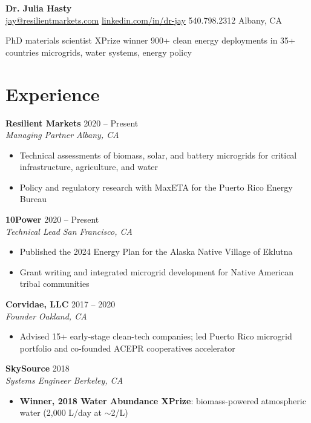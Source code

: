 \documentclass[11pt,letterpaper]{article}
\newcommand{\role}[4]{%
  \textbf{#1} \hfill #2\\
  \textit{#3} \hfill \textit{#4}\\[-2pt]
}
\begin{document}
\begin{center}
  {\LARGE\bfseries Dr. Julia Hasty}\\[6pt]
  \href{mailto:jay@resilientmarkets.com}{jay@resilientmarkets.com} \textbullet{}
  \href{https://www.linkedin.com/in/dr-jay/}{linkedin.com/in/dr-jay} \textbullet{}
  540.798.2312 \textbullet{} Albany, CA
\end{center}

\vspace{4pt}
\begin{center}
\small
PhD materials scientist \textbullet{} XPrize winner \textbullet{}
900+ clean energy deployments in 35+ countries \textbullet{}
microgrids, water systems, energy policy
\end{center}

\section{Experience}

\role{Resilient Markets}{2020 -- Present}{Managing Partner}{Albany, CA}
\begin{itemize}[nosep, leftmargin=*]
  \item Technical assessments of biomass, solar, and battery microgrids for critical infrastructure, agriculture, and water
  \item Policy and regulatory research with MaxETA for the Puerto Rico Energy Bureau
\end{itemize}

\role{10Power}{2020 -- Present}{Technical Lead}{San Francisco, CA}
\begin{itemize}[nosep, leftmargin=*]
  \item Published the 2024 Energy Plan for the Alaska Native Village of Eklutna
  \item Grant writing and integrated microgrid development for Native American tribal communities
\end{itemize}

\role{Corvidae, LLC}{2017 -- 2020}{Founder}{Oakland, CA}
\begin{itemize}[nosep, leftmargin=*]
  \item Advised 15+ early-stage clean-tech companies; led Puerto Rico microgrid portfolio and co-founded ACEPR cooperatives accelerator
\end{itemize}

\role{SkySource}{2018}{Systems Engineer}{Berkeley, CA}
\begin{itemize}[nosep, leftmargin=*]
  \item \textbf{Winner, 2018 Water Abundance XPrize}: biomass-powered atmospheric water (2,000 L/day at $\sim$2\textcent/L)
\end{itemize}
\end{document}
